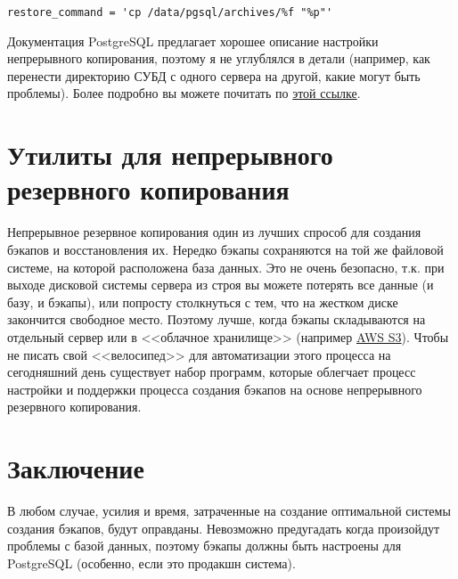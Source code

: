 \begin{lstlisting}[label=lst:backups17,caption=recovery.conf]
restore_command = 'cp /data/pgsql/archives/%f "%p"'
\end{lstlisting}

Документация PostgreSQL предлагает хорошее описание настройки непрерывного копирования, поэтому я не углублялся в детали (например, как перенести директорию СУБД с одного сервера на другой, какие могут быть проблемы). Более подробно вы можете почитать по \href{http://www.postgresql.org/docs/current/static/continuous-archiving.html}{этой ссылке}.


\section{Утилиты для непрерывного резервного копирования}

Непрерывное резервное копирования один из лучших спрособ для создания бэкапов и восстановления их. Нередко бэкапы сохраняются на той же файловой системе, на которой расположена база данных. Это не очень безопасно, т.к. при выходе дисковой системы сервера из строя вы можете потерять все данные (и базу, и бэкапы), или попросту столкнуться с тем, что на жестком диске закончится свободное место. Поэтому лучше, когда бэкапы складываются на отдельный сервер или в <<облачное хранилище>> (например \href{http://aws.amazon.com/s3/}{AWS S3}). Чтобы не писать свой <<велосипед>> для автоматизации этого процесса на сегодняшний день существует набор программ, которые облегчает процесс настройки и поддержки процесса создания бэкапов на основе непрерывного резервного копирования.




\section{Заключение}

В любом случае, усилия и время, затраченные на создание оптимальной системы создания бэкапов, будут оправданы. Невозможно предугадать когда произойдут проблемы с базой данных, поэтому бэкапы должны быть настроены для PostgreSQL (особенно, если это продакшн система).
